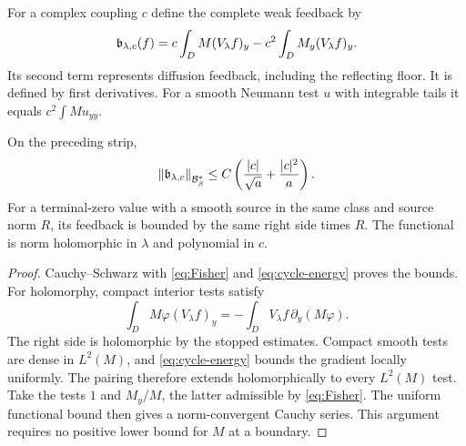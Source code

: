 For a complex coupling $c$ define the complete weak feedback by
\begin{equation}\label{eq:feedback-functional}
 \mathfrak b_{\lambda,c}(f)
   =c\int_D M(V_\lambda f)_y-c^2\int_D M_y(V_\lambda f)_y.
\end{equation}
Its second term represents diffusion feedback, including the reflecting
floor. It is defined by first derivatives. For a smooth Neumann test
$u$ with integrable tails it equals $c^2\int M u_{yy}$.

\begin{corollary}\label{cor:feedback}
On the preceding strip,
\begin{equation}\label{eq:feedback-bound}
 \left\|\mathfrak b_{\lambda,c}\right\|_{\mathcal B_\beta^*}
       \le C\left(\frac{|c|}{\sqrt a}+\frac{|c|^2}{a}\right).
\end{equation}
For a terminal-zero value with a smooth source in the same class and
source norm $R$, its feedback is bounded
by the same right side times $R$. The functional is norm holomorphic
in $\lambda$ and polynomial in $c$.
\end{corollary}

\begin{proof}
Cauchy--Schwarz with \eqref{eq:Fisher} and
\eqref{eq:cycle-energy} proves the bounds. For holomorphy, compact
interior tests satisfy
\[
 \int_D M\varphi(V_\lambda f)_y
       =-\int_DV_\lambda f\,\partial_y(M\varphi).
\]
The right side is holomorphic by the stopped estimates. Compact smooth
tests are dense in $L^2(M)$, and \eqref{eq:cycle-energy} bounds the
gradient locally uniformly. The pairing therefore extends
holomorphically to every $L^2(M)$ test. Take the tests $1$ and $M_y/M$,
the latter admissible by \eqref{eq:Fisher}. The uniform functional bound
then gives a norm-convergent Cauchy series. This argument requires no
positive lower bound for $M$ at a boundary.
\end{proof}
